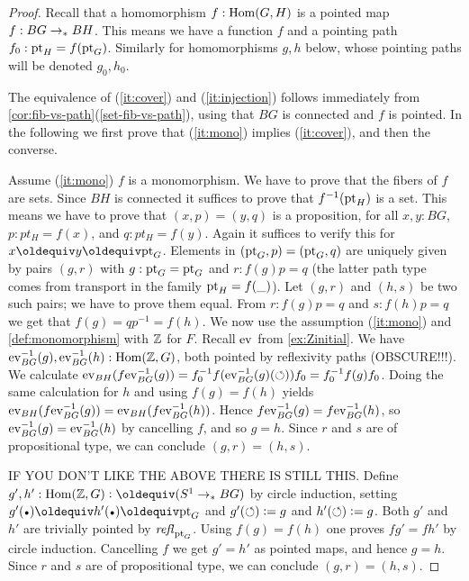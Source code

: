 \begin{proof}
Recall that a homomorphism $f: \mathrm{Hom}(G,H)$ is a pointed map $f: BG\to_\ast BH$.
This means we have a function $f$ and a pointing path $f_0 : \mathrm{pt}_H = f(\mathrm{pt}_G)$. 
Similarly for homomorphisms $g,h$ below, whose pointing paths will be denoted $g_0,h_0$.

The equivalence of (\ref{it:cover}) and (\ref{it:injection}) follows
immediately from \cref{cor:fib-vs-path}(\ref{set-fib-vs-path}), using
that $BG$ is connected and $f$ is pointed.
In the following we first prove that (\ref{it:mono}) implies (\ref{it:cover}),
and then the converse.

Assume (\ref{it:mono}) $f$ is a monomorphism. 
We have to prove that the fibers of $f$ are sets.
Since $BH$ is connected it suffices to prove that $f^{-1}(\mathrm{pt}_H)$ is a set. 
This means we have to prove that $(x,p) = (y,q)$ is a proposition,
for all $x,y:BG$, $p: pt_H = f(x)$, and $q: pt_H = f(y)$.
Again it suffices to verify this for $x\jdeq y\jdeq\pt_G$.
Elements in $(\mathrm{pt}_G,p) = (\mathrm{pt}_G,q)$ are uniquely given by pairs $(g,r)$
with $g: \mathrm{pt}_G = \mathrm{pt}_G$ and $r : f(g)p = q$
(the latter path type comes from transport in the family $\mathrm{pt}_H = f(\_)$).
Let $(g,r)$ and $(h,s)$ be two such pairs; we have to prove them equal. 
From $r : f(g)p = q$ and $s : f(h)p = q$ we get that $f(g)=qp^{-1}=f(h)$.
We now use the assumption (\ref{it:mono}) and
\cref{def:monomorphism} with $\mathbb{Z}$ for $F$.
Recall $\mathrm{ev}$ from \cref{ex:Zinitial}. 
We have $\mathrm{ev}_{BG}^{-1}(g),\mathrm{ev}_{BG}^{-1}(h) : \mathrm{Hom}(\mathbb{Z},G)$,
both pointed by reflexivity paths (OBSCURE!!!). We calculate
$\mathrm{ev}_{BH}(f\mathrm{ev}_{BG}^{-1}(g)) = f_0^{-1} f(\mathrm{ev}_{BG}^{-1}(g)(\circlearrowleft)) f_0 = f_0^{-1} f(g) f_0$.
Doing the same calculation for $h$ and using $f(g)=f(h)$ yields
$\mathrm{ev}_{BH}(f\mathrm{ev}_{BG}^{-1}(g)) = \mathrm{ev}_{BH}(f\mathrm{ev}_{BG}^{-1}(h))$.
Hence $f\mathrm{ev}_{BG}^{-1}(g) = f\mathrm{ev}_{BG}^{-1}(h)$, so
$\mathrm{ev}_{BG}^{-1}(g) = \mathrm{ev}_{BG}^{-1}(h)$ by cancelling $f$, and so $g=h$. 
Since $r$ and $s$ are of propositional type, we can conclude $(g,r) = (h,s)$.

IF YOU DON'T LIKE THE ABOVE THERE IS STILL THIS.
Define $g',h': \Hom(\ZZ,G) \defeq (\Sc\ptdto BG)$
by circle induction, setting $g'(\base)\jdeq h'(\base)\jdeq\pt_G$
and $g'(\circlearrowleft)\vcentcolon= g$ and $h'(\circlearrowleft)\vcentcolon= g$. Both $g'$ and $h'$
are trivially pointed by $\mathop{\mathit{refl}_{\mathrm{pt}_G}}$. Using $f(g)=f(h)$ one
proves $fg'=fh'$ by circle induction. Cancelling $f$ we get $g'=h'$
as pointed maps, and hence $g=h$. 
Since $r$ and $s$ are of propositional type, we can conclude $(g,r) = (h,s)$.


\end{proof}

